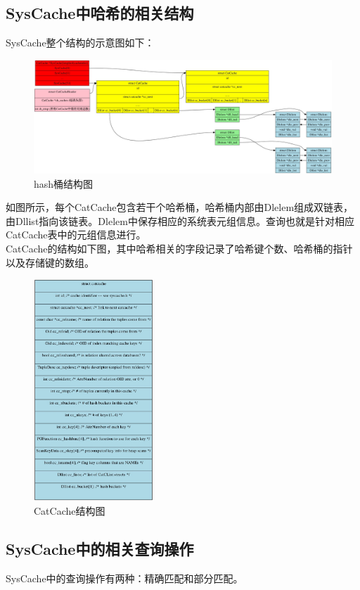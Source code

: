 \documentclass{article}
\begin{document}
\begin{CJK*}{UTF8}{gkai}
\subsection{SysCache中哈希的相关结构}

\indent SysCache整个结构的示意图如下：
\begin{figure}[H] 
\centering
\includegraphics[width = \textwidth]{syscache.jpg}
\caption{hash桶结构图}
\label{overflow}
\end{figure}
\indent 如图所示，每个CatCache包含若干个哈希桶，哈希桶内部由Dlelem组成双链表，由Dllist指向该链表。Dlelem中保存相应的系统表元组信息。查询也就是针对相应CatCache表中的元组信息进行。\\

\indent CatCache的结构如下图，其中哈希相关的字段记录了哈希键个数、哈希桶的指针以及存储键的数组。
\begin{figure}[H] 
\centering
\includegraphics[width = 0.4\textwidth]{catcache.jpg}
\caption{CatCache结构图}
\label{overflow}
\end{figure}


\subsection{SysCache中的相关查询操作}
\indent SysCache中的查询操作有两种：精确匹配和部分匹配。

\end{CJK*}
\end{document}
